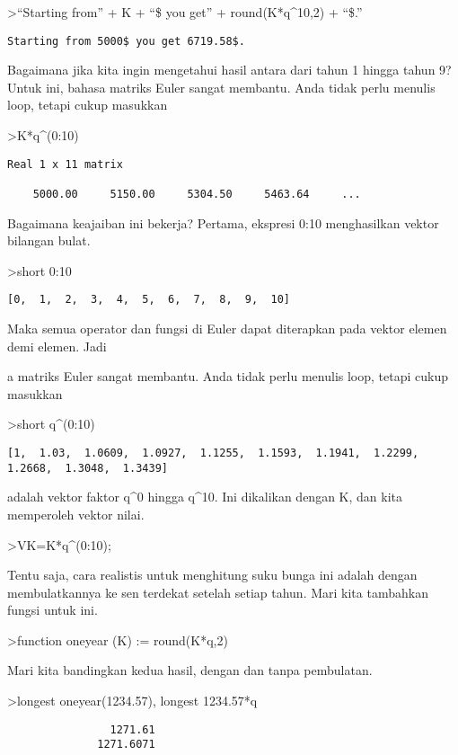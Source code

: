 \documentclass[
]{book}
\begin{document}
\textgreater{}``Starting from'' + K + ``\$ you get'' + round(K*q\^{}10,2) + ``\$.''

\begin{verbatim}
Starting from 5000$ you get 6719.58$.
\end{verbatim}

Bagaimana jika kita ingin mengetahui hasil antara dari tahun 1 hingga tahun 9? Untuk ini, bahasa matriks Euler sangat membantu. Anda tidak perlu menulis loop, tetapi cukup masukkan

\textgreater K*q\^{}(0:10)

\begin{verbatim}
Real 1 x 11 matrix

    5000.00     5150.00     5304.50     5463.64     ...
\end{verbatim}

Bagaimana keajaiban ini bekerja? Pertama, ekspresi 0:10 menghasilkan vektor bilangan bulat.

\textgreater short 0:10

\begin{verbatim}
[0,  1,  2,  3,  4,  5,  6,  7,  8,  9,  10]
\end{verbatim}

Maka semua operator dan fungsi di Euler dapat diterapkan pada vektor elemen demi elemen. Jadi

a matriks Euler sangat membantu. Anda tidak perlu menulis loop, tetapi cukup masukkan

\textgreater short q\^{}(0:10)

\begin{verbatim}
[1,  1.03,  1.0609,  1.0927,  1.1255,  1.1593,  1.1941,  1.2299,
1.2668,  1.3048,  1.3439]
\end{verbatim}

adalah vektor faktor q\^{}0 hingga q\^{}10. Ini dikalikan dengan K, dan kita memperoleh vektor nilai.

\textgreater VK=K*q\^{}(0:10);

Tentu saja, cara realistis untuk menghitung suku bunga ini adalah dengan membulatkannya ke sen terdekat setelah setiap tahun. Mari kita tambahkan fungsi untuk ini.

\textgreater function oneyear (K) := round(K*q,2)

Mari kita bandingkan kedua hasil, dengan dan tanpa pembulatan.

\textgreater longest oneyear(1234.57), longest 1234.57*q

\begin{verbatim}
                1271.61 
              1271.6071 
\end{verbatim}
\end{document}
